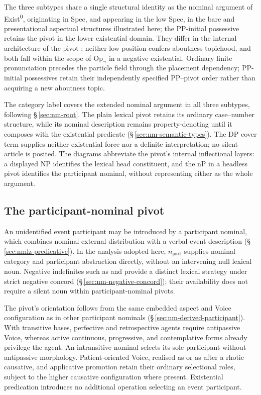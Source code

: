 \noindent The three subtypes share a single structural identity as the nominal
argument of Exist\textsuperscript{0}, originating in Spec,
and appearing in the low Spec, in the bare and presentational
aspectual structures illustrated here; the PP-initial possessive retains the
pivot in the lower existential domain. They differ in the internal architecture of the pivot
; neither low position confers aboutness topichood, and both fall
within the scope of $\mathrm{Op}_{\neg}$ in a negative existential.
Ordinary finite pronunciation precedes the particle field through the
placement dependency; PP-initial possessives retain their independently
specified PP--pivot order rather than acquiring a new aboutness topic.

The category label  covers the extended nominal argument in
all three subtypes, following §\,\ref{sec:nm-root}. The plain lexical
pivot retains its ordinary case--number structure, while its nominal
description remains property-denoting until it composes with the existential
predicate (§\,\ref{sec:nm-semantic-types}). The DP cover term supplies
neither existential force nor a definite interpretation; no silent article
is posited. The diagrams
abbreviate the pivot's internal inflectional layers: a displayed NP identifies
the lexical head constituent, and the nP in a headless pivot identifies the
participant nominal, without representing either as the whole argument.

\subsection{The participant-nominal pivot}
\label{sec:exst-pivot-arch}

An unidentified event participant may be introduced by a participant nominal,
which combines nominal external distribution with a verbal event description
(§\,\ref{sec:nmlz-predicative}). In the analysis
adopted here, $n_{\mathrm{part}}$ supplies nominal category and participant
abstraction directly, without an intervening null lexical noun. Negative
indefinites such as   and
  provide a distinct lexical strategy under strict
negative concord (§\,\ref{sec:nm-negative-concord}); their availability does not
require a silent noun within participant-nominal pivots.

The pivot's orientation follows from the same embedded aspect and Voice
configuration as in other participant nominals
(§\,\ref{sec:nm-derived-participant}). With transitive bases, perfective
and retrospective agents require antipassive Voice, whereas active continuous,
progressive, and contemplative forms already privilege the agent. An
intransitive nominal selects its sole participant without antipassive
morphology. Patient-oriented Voice, realised as  or as
 after a rhotic causative, and applicative promotion retain their
ordinary selectional roles, subject to the higher causative configuration where present. Existential
predication introduces no additional operation selecting an event participant.


